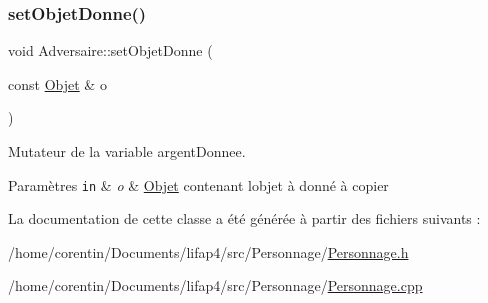 \subsubsection{\texorpdfstring{set\+Objet\+Donne()}{setObjetDonne()}}
{\footnotesize\ttfamily void Adversaire\+::set\+Objet\+Donne (\begin{DoxyParamCaption}\item[{const \hyperlink{class_objet}{Objet} \&}]{o }\end{DoxyParamCaption})}



Mutateur de la variable argent\+Donnee. 


\begin{DoxyParams}[1]{Paramètres}
\mbox{\tt in}  & {\em o} & \hyperlink{class_objet}{Objet} contenant l\textquotesingle{}objet à donné à copier \\
\hline
\end{DoxyParams}


La documentation de cette classe a été générée à partir des fichiers suivants \+:\begin{DoxyCompactItemize}
\item 
/home/corentin/\+Documents/lifap4/src/\+Personnage/\hyperlink{_personnage_8h}{Personnage.\+h}\item 
/home/corentin/\+Documents/lifap4/src/\+Personnage/\hyperlink{_personnage_8cpp}{Personnage.\+cpp}\end{DoxyCompactItemize}
